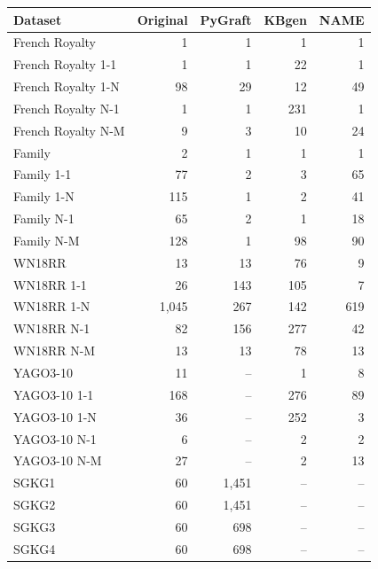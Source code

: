 \begin{tabular}{lrrrr}
\toprule
Dataset & Original & PyGraft & KBgen & NAME \\
\midrule
French Royalty & 1 & 1 & 1 & 1 \\
French Royalty 1-1 & 1 & 1 & 22 & 1 \\
French Royalty 1-N & 98 & 29 & 12 & 49 \\
French Royalty N-1 & 1 & 1 & 231 & 1 \\
French Royalty N-M & 9 & 3 & 10 & 24 \\
\midrule
Family & 2 & 1 & 1 & 1 \\
Family 1-1 & 77 & 2 & 3 & 65 \\
Family 1-N & 115 & 1 & 2 & 41 \\
Family N-1 & 65 & 2 & 1 & 18 \\
Family N-M & 128 & 1 & 98 & 90 \\
\midrule
WN18RR & 13 & 13 & 76 & 9 \\
WN18RR 1-1 & 26 & 143 & 105 & 7 \\
WN18RR 1-N & 1{,}045 & 267 & 142 & 619 \\
WN18RR N-1 & 82 & 156 & 277 & 42 \\
WN18RR N-M & 13 & 13 & 78 & 13 \\
\midrule
YAGO3-10 & 11 & – & 1 & 8 \\
YAGO3-10 1-1 & 168 & – & 276 & 89 \\
YAGO3-10 1-N & 36 & – & 252 & 3 \\
YAGO3-10 N-1 & 6 & – & 2 & 2 \\
YAGO3-10 N-M & 27 & – & 2 & 13 \\
\midrule
SGKG1 & 60 & 1{,}451 & – & – \\
SGKG2 & 60 & 1{,}451 & – & – \\
SGKG3 & 60 & 698 & – & – \\
SGKG4 & 60 & 698 & – & – \\
\bottomrule
\end{tabular}
